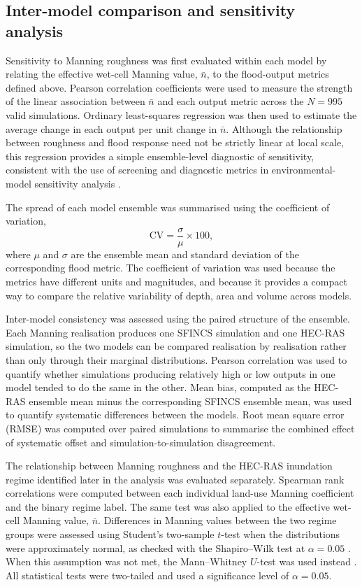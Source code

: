 \documentclass[a4paper,fleqn]{cas-sc}
\newcommand{\CV}{\text{CV}}
\newcommand{\sfincs}{\textsc{SFINCS}}
\newcommand{\hecras}{\textsc{HEC-RAS}}
\begin{document}
\subsection{Inter-model comparison and sensitivity analysis}\label{sec:sensitivity}
Sensitivity to Manning roughness was first evaluated within each model by relating the effective wet-cell Manning value, $\bar{n}$, to the flood-output metrics defined above. Pearson correlation coefficients were used to measure the strength of the linear association between $\bar{n}$ and each output metric across the $N=\num{995}$ valid simulations. Ordinary least-squares regression was then used to estimate the average change in each output per unit change in $\bar{n}$. Although the relationship between roughness and flood response need not be strictly linear at local scale, this regression provides a simple ensemble-level diagnostic of sensitivity, consistent with the use of screening and diagnostic metrics in environmental-model sensitivity analysis \citep{pianosi2016}.

The spread of each model ensemble was summarised using the coefficient of variation,
\begin{equation}
\CV = \frac{\sigma}{\mu}\times 100 ,
\label{eq:cv}
\end{equation}
where $\mu$ and $\sigma$ are the ensemble mean and standard deviation of the corresponding flood metric. The coefficient of variation was used because the metrics have different units and magnitudes, and because it provides a compact way to compare the relative variability of depth, area and volume across models.

Inter-model consistency was assessed using the paired structure of the ensemble. Each Manning realisation produces one \sfincs{} simulation and one \hecras{} simulation, so the two models can be compared realisation by realisation rather than only through their marginal distributions. Pearson correlation was used to quantify whether simulations producing relatively high or low outputs in one model tended to do the same in the other. Mean bias, computed as the \hecras{} ensemble mean minus the corresponding \sfincs{}
ensemble mean, was used to quantify systematic differences between the models. Root mean square error (RMSE) was computed over paired simulations to summarise the combined effect of systematic offset and simulation-to-simulation disagreement.

The relationship between Manning roughness and the \hecras{} inundation regime identified later in the analysis was evaluated separately. Spearman rank correlations were computed between each individual land-use Manning coefficient and the binary regime label. The same test was also applied to the effective wet-cell Manning value, $\bar{n}$. Differences in Manning values between the two regime groups were assessed using Student's two-sample $t$-test when the distributions were approximately normal, as checked with the Shapiro--Wilk test at $\alpha=0.05$ \citep{shapiro1965}. When this assumption was not met, the Mann--Whitney $U$-test was used instead \citep{mann1947}. All statistical tests were two-tailed and used a
significance level of $\alpha=0.05$.
\end{document}
